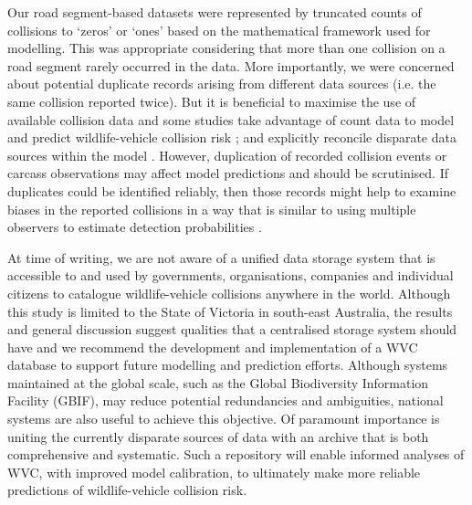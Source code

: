 Our road segment-based datasets were represented by truncated counts of collisions to `zeros' or `ones' based on the mathematical framework used for modelling. This was appropriate considering that more than one collision on a road segment rarely occurred in the data. More importantly, we were concerned about potential duplicate records arising from different data sources (i.e. the same collision reported twice). But it is beneficial to maximise the use of available collision data and some studies take advantage of count data to model and predict wildlife-vehicle collision risk \citep{cser13}; and explicitly reconcile disparate data sources within the model \citep{lao11a}. However, duplication of recorded collision events or carcass observations may affect model predictions and should be scrutinised. If duplicates could be identified reliably, then those records might help to examine biases in the reported collisions in a way that is similar to using multiple observers to estimate detection probabilities \citep{nich00}.

At time of writing, we are not aware of a unified data storage system that is accessible to and used by governments, organisations, companies and individual citizens to catalogue wildlife-vehicle collisions anywhere in the world. Although this study is limited to the State of Victoria in south-east Australia, the results and general discussion suggest qualities that a centralised storage system should have and we recommend the development and implementation of a WVC database to support future modelling and prediction efforts. Although systems maintained at the global scale, such as the Global Biodiversity Information Facility (GBIF), may reduce potential redundancies and ambiguities, national systems are also useful to achieve this objective. Of paramount importance is uniting the currently disparate sources of data with an archive that is both comprehensive and systematic. Such a repository will enable informed analyses of WVC, with improved model calibration, to ultimately make more reliable predictions of wildlife-vehicle collision risk. 
